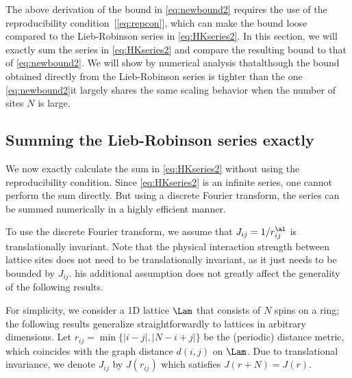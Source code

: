 \label{sec:exactsumbound}
The above derivation of the bound in \cref{eq:newbound2} requires the use of the reproducibility condition~[\cref{eq:repcon}], which can make the bound loose compared to the Lieb-Robinson series in \cref{eq:HKseries2}. In this section, we will exactly sum the series in \cref{eq:HKseries2} and compare the resulting bound to that of \cref{eq:newbound2}. We will show by numerical analysis that\dash although the bound obtained directly from the Lieb-Robinson series is tighter than the one \cref{eq:newbound2}\dash it largely shares the same scaling behavior when the number of sites $N$ is large.

\subsection{Summing the Lieb-Robinson series exactly}
\label{sec:exactsumboundproof}
We now exactly calculate the sum in \cref{eq:HKseries2} without using the reproducibility condition. Since \cref{eq:HKseries2} is an infinite series, one cannot perform the sum directly. But using a discrete Fourier transform, the series can be summed numerically in a highly efficient manner.

To use the discrete Fourier transform, we assume that $J_{ij}=1/r_{ij}^\al$ is translationally invariant. Note that the physical interaction strength between lattice sites does not need to be translationally invariant, as it just needs to be bounded by $J_{ij}$. his additional assumption does not greatly affect the generality of the following results.

For simplicity, we consider a 1D lattice $\Lam$ that consists of $N$ spins on a ring; the following results generalize straightforwardly to lattices in arbitrary dimensions. Let $r_{ij} = \min\{|i-j|,|N-i+j|\}$ be the (periodic) distance metric, which coincides with the graph distance $d(i,j)$ on $\Lam$. Due to translational invariance, we denote $J_{ij}$ by $J(r_{ij})$ which satisfies $J(r+N) = J(r)$.

